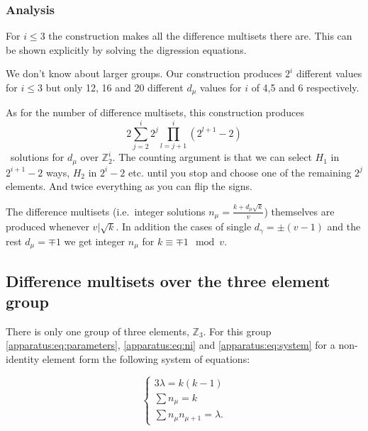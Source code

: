     \subsubsection{Analysis}
        For $i \leq 3$ the construction makes all the difference multisets there are. This can be shown explicitly by solving the digression equations.
        
        We don't know about larger groups. Our construction produces $2^i$ different values for $i \leq 3$ but only 12, 16 and 20 different $d_\mu$ values for $i$ of 4,5 and 6 respectively.
        
        As for the number of difference multisets, this construction produces
        \begin{equation}
            2 \sum\limits_{j=2}^i 2^j \prod\limits_{l=j+1}^i (2^{l+1}-2)
        \end{equation}\
        solutions for $d_\mu$ over $\mathbb Z_2^i$. The counting argument is that we can select $H_1$ in $2^{i+1}-2$ ways, $H_2$ in $2^i-2$ etc. until you stop and choose one of the remaining $2^j$ elements. And twice everything as you can flip the signs.
        
        The difference multisets (i.e.\ integer solutions $n_\mu=\frac{k+d_\mu \sqrt k}v$) themselves are produced whenever $v | \sqrt k$. In addition the cases of single $d_\gamma = \pm (v-1)$ and the rest $d_\mu = \mp 1$ we get integer $n_\mu$ for $k \equiv \mp 1 \mod v$.
        
\subsection{Difference multisets over the three element group}
    \label{sec:z3}
    There is only one group of three elements, $\mathbb Z_3$.
For this group \eqref{apparatus:eq:parameters}, \eqref{apparatus:eq:ni} and \eqref{apparatus:eq:system} for a non-identity element form the following system of equations:

    \begin{equation}
        \label{v3:eq:constraints}
        \begin{cases}
            3\lambda = k(k-1) \\
            \sum n_\mu = k \\
            \sum n_\mu n_{\mu+1} = \lambda.
        \end{cases}
    \end{equation}

